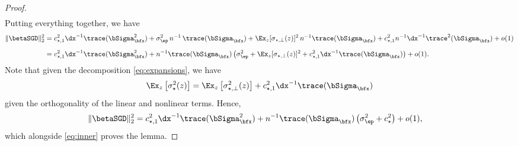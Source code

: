 \begin{proof}
\begin{align*}
    \end{align*}
    Putting everything together, we have
    \begin{align*}
    \|\betaSGD\|_2^2 &= c_{\star,1}^2 \dx^{-1} \trace(\bSigma_\bfx^2) +  \sigma_\ep^2 \,n^{-1}\, \trace(\bSigma_\bfx) + \Ex_z [\sigma_{\star, \perp}(z)]^2 \, n^{-1} \trace(\bSigma_\bfx) + c_{\star,1}^2n^{-1} \dx^{-1} \trace^2(\bSigma_\bfx)+ o(1)\\[0.2cm]
    &= c_{\star,1}^2 \dx^{-1} \trace(\bSigma_\bfx^2) +  n^{-1} \trace(\bSigma_\bfx) \left(\sigma_\ep^2 +  \Ex_z [\sigma_{\star, \perp}(z)]^2+c_{\star,1}^2 \dx^{-1}\trace(\bSigma_{\bfx})\right) + o(1).
    \end{align*}
    Note that given the decomposition \eqref{eq:expansions}, we have
    \begin{align*}
        \Ex_z \left[\sigma_\star^2(z)\right] = \Ex_z \left[\sigma_{\star,\perp}^2(z)\right] + c_{\star,1}^2 \dx^{-1} \trace(\bSigma_{\bfx})
    \end{align*}
    given the orthogonality of the linear and nonlinear terms. Hence,
    \begin{align*}
        \|\betaSGD\|_2^2 &= c_{\star,1}^2 \dx^{-1} \trace(\bSigma_\bfx^2) +  n^{-1} \trace(\bSigma_\bfx) \left(\sigma_\ep^2 +  c_{\star}^2\right) + o(1),
    \end{align*}
    which alongside \eqref{eq:inner} proves the lemma.
\end{proof}



